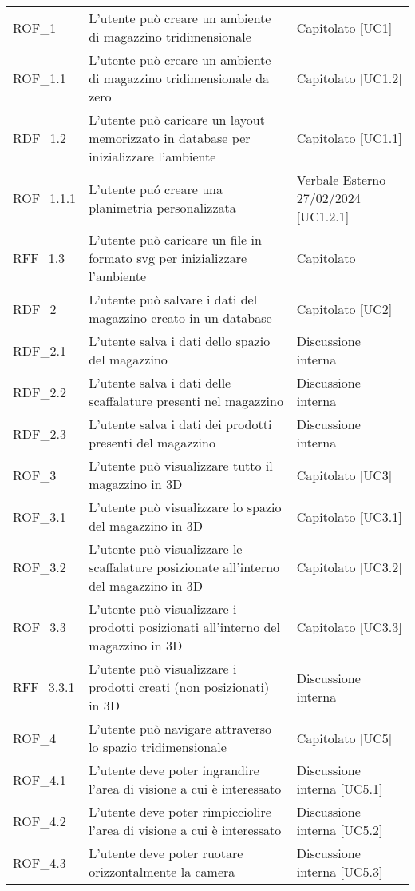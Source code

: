 \begin{xltabular}{\textwidth}{ p{0.2\textwidth} | X | p{0.2\textwidth} }
    ROF\_1& L'utente può creare un ambiente di magazzino tridimensionale & Capitolato [UC1]\\
    ROF\_1.1& L'utente può creare un ambiente di magazzino tridimensionale da zero & Capitolato [UC1.2]\\
    RDF\_1.2& L'utente può caricare un layout memorizzato in database per inizializzare l'ambiente & Capitolato [UC1.1]\\
    ROF\_1.1.1 & L'utente puó creare una planimetria personalizzata & Verbale Esterno 27/02/2024 [UC1.2.1]\\
    RFF\_1.3& L'utente può caricare un file in formato svg per inizializzare l'ambiente & Capitolato \\
    RDF\_2& L'utente può salvare i dati del magazzino creato in un database & Capitolato [UC2]  \\
    RDF\_2.1& L'utente salva i dati dello spazio del magazzino & Discussione interna   \\
    RDF\_2.2& L'utente salva i dati delle scaffalature presenti nel magazzino & Discussione interna   \\
    RDF\_2.3& L'utente salva i dati dei prodotti presenti del magazzino & Discussione interna     \\
    ROF\_3& L'utente può visualizzare tutto il magazzino in 3D & Capitolato [UC3]\\
    ROF\_3.1& L'utente può visualizzare lo spazio del magazzino in 3D & Capitolato [UC3.1]\\
    ROF\_3.2& L'utente può visualizzare le scaffalature posizionate all'interno del magazzino in 3D & Capitolato [UC3.2]\\
    ROF\_3.3& L'utente può visualizzare i prodotti posizionati all'interno del magazzino in 3D & Capitolato [UC3.3]\\
    RFF\_3.3.1& L'utente può visualizzare i prodotti creati (non posizionati) in 3D & Discussione interna       \\
    ROF\_4& L'utente può navigare attraverso lo spazio tridimensionale & Capitolato [UC5]\\
    ROF\_4.1& L'utente deve poter ingrandire l'area di visione a cui è interessato & Discussione interna [UC5.1] \\
    ROF\_4.2& L'utente deve poter rimpicciolire l'area di visione a cui è interessato & Discussione interna [UC5.2] \\
    ROF\_4.3& L'utente deve poter ruotare orizzontalmente la camera & Discussione interna [UC5.3] \\

\end{xltabular}
